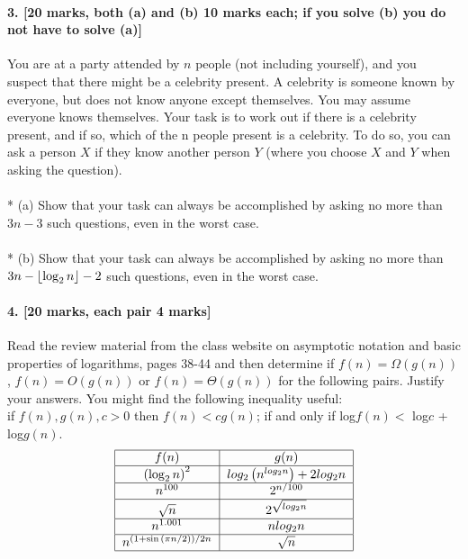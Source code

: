 \documentclass[a4paper]{scrartcl}
\begin{document}
\paragraph{3. [20 marks, both (a) and (b) 10 marks each; if you solve (b) you do not have to
solve (a)]}
\label{sec:Question 3}
You are at a party attended by $n$ people (not including yourself), and you suspect that there might be a celebrity present. A celebrity is someone known by everyone, but does not know anyone except themselves. You may assume everyone knows themselves. Your task is to work out if there is a celebrity present, and if so, which of the n people present is a celebrity. To do so, you can ask a person $X$ if they know another person $Y$ (where you choose $X$ and $Y$ when asking the question).\\
\\*
(a) Show that your task can always be accomplished by asking no more than $3n-3$ such questions, even in the worst case.\\
\\*
(b) Show that your task can always be accomplished by asking no more than $3n-\left\lfloor \log_2{n} \right\rfloor-2$ such questions, even in the worst case.

\paragraph{4. [20 marks, each pair 4 marks]}
\label{sec:Question 4}
Read the review material from the class website on asymptotic notation and basic properties of logarithms, pages 38-44 and then determine if $f(n) = \Omega(g(n))$, $f(n) = O(g(n))$ or $f (n) = \Theta(g(n))$ for the following pairs. Justify your answers. You might find the following inequality useful: \\
if $f (n), g(n), c > 0$ then $f (n) < c g(n)$; if and only if log$f(n) <$ log$c$ + log$g(n)$.
\begin{align*}
\begin{tabular}{|c | c |}
  \hline
  $f(n)$ & $g(n)$ \\
  \hline
  $\left(\log_2n\right)^2$ & $log_2\left(n^{log_2{n}}\right) + 2 log_2n$ \\
  \hline
  $n^{100}$ & $2^{n/100}$ \\
  \hline
  $\sqrt{n}$ & $2^{\sqrt{log_2 n}}$\\
    \hline
  $n^{1.001}$ & $n log_2 n$\\
  \hline
  $n^{(1+\sin{(\pi n/2))}/2n}$ &  $\sqrt{n}$\\
  \hline
\end{tabular}
\end{align*}
\end{document}
